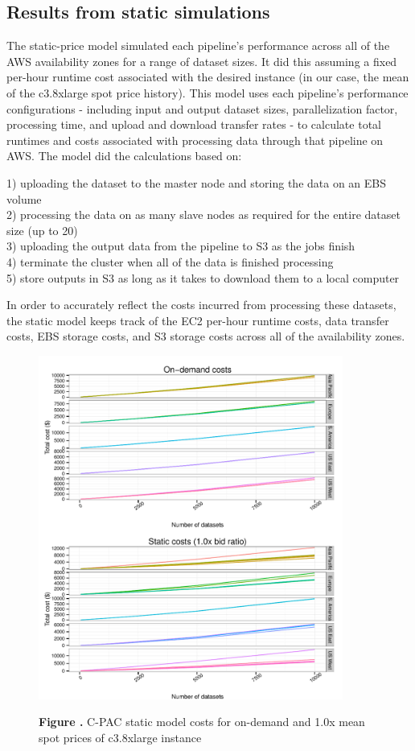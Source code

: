 \documentclass{frontiersSCNS} %
\begin{document}
\subsection{Results from static simulations}

The static-price model simulated each pipeline's performance across all of the AWS availability zones for a range of dataset sizes. It did this assuming a fixed per-hour runtime cost associated with the desired instance (in our case, the mean of the c3.8xlarge spot price history). This model uses each pipeline's performance configurations - including input and output dataset sizes, parallelization factor, processing time, and upload and download transfer rates - to calculate total runtimes and costs associated with processing data through that pipeline on AWS. The model did the calculations based on:

1) uploading the dataset to the master node and storing the data on an EBS volume\\2) processing the data on as many slave nodes as required for the entire dataset size (up to 20)\\3) uploading the output data from the pipeline to S3 as the jobs finish\\4) terminate the cluster when all of the data is finished processing\\5) store outputs in S3 as long as it takes to download them to a local computer

In order to accurately reflect the costs incurred from processing these datasets, the static model keeps track of the EC2 per-hour runtime costs, data transfer costs, EBS storage costs, and S3 storage costs across all of the availability zones.

\begin{figure}[h!]
\begin{center}
\includegraphics[width=10cm]{../../spot-model/plots/cpac_ondemand_static.pdf}%
\end{center}
 \textbf{\label{fig:01} Figure .}{ C-PAC static model costs for on-demand and 1.0x mean spot prices of c3.8xlarge instance }
\end{figure}
\end{document}

